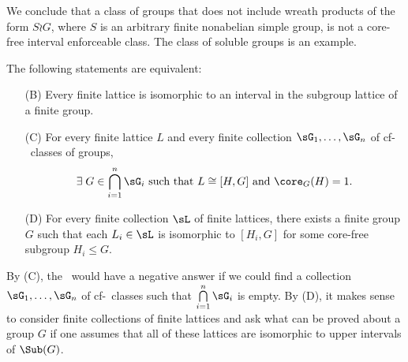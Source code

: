 \begin{frame}[label=IEPropsLemma2]{}
We conclude that a class of groups that does
not include wreath products of the form $S\wr G$, where $S$ is an arbitrary
finite nonabelian simple group, is not a core-free interval enforceable class. 
The class of soluble groups is an example.
\end{frame}




\begin{frame}[fragile,label=Parachutes]{}
\begin{theorem}
The following statements are equivalent:
\begin{enumerate}
\item[(B)] Every finite lattice is isomorphic to
  an interval in the subgroup lattice of a finite group.
\item[(C)]
For every finite lattice $L$ and every finite collection $\sG_1, \dots, \sG_n$
of cf-\IE\ classes of groups,
\[
\exists \; G \in \bigcap\limits_{i=1}^n \sG_i \text{ such that $L \cong [H,G]$
  and $\core_G(H)=1$}.
\]
\item[(D)]
For every finite collection $\sL$ of finite lattices, there exists a finite
group $G$ such that each $L_i \in \sL$ is isomorphic to $[H_i, G]$ for some
core-free subgroup $H_i\leq G$.
\end{enumerate}
\end{theorem}
\end{frame}

\begin{frame}[fragile,label=Parachutes]{}
By (C), the \FLRP\ would have a negative answer if we
could find a collection $\sG_1, \dots, \sG_n$ of cf-\IE\ classes
such that $\bigcap\limits_{i=1}^n \sG_i$ is empty.
\vskip6mm
By (D), it makes sense to consider finite collections of finite lattices and ask
what can be proved about a group $G$ if one assumes that all of these lattices are
isomorphic to upper intervals of $\Sub(G)$. 
\end{frame}

